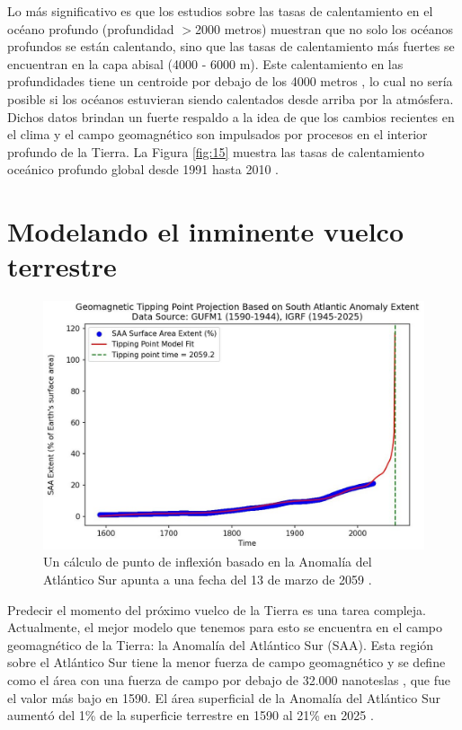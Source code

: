 \documentclass[10pt,twocolumn,letterpaper]{article}
\begin{document}
Lo más significativo es que los estudios sobre las tasas de calentamiento en el océano profundo (profundidad $>$2000 metros) muestran que no solo los océanos profundos se están calentando, sino que las tasas de calentamiento más fuertes se encuentran en la capa abisal (4000 - 6000 m). Este calentamiento en las profundidades tiene un centroide por debajo de los 4000 metros \cite{132,129}, lo cual no sería posible si los océanos estuvieran siendo calentados desde arriba por la atmósfera. Dichos datos brindan un fuerte respaldo a la idea de que los cambios recientes en el clima y el campo geomagnético son impulsados por procesos en el interior profundo de la Tierra. La Figura \ref{fig:15} muestra las tasas de calentamiento oceánico profundo global desde 1991 hasta 2010 \cite{132}.

\section{Modelando el inminente vuelco terrestre}

\begin{figure}[t]
\begin{center}
   \includegraphics[width=1\linewidth]{saa-crop.jpeg}
\end{center}
   \caption{Un cálculo de punto de inflexión basado en la Anomalía del Atlántico Sur apunta a una fecha del 13 de marzo de 2059 \cite{125,126}.}
\label{fig:16}
\label{fig:onecol}
\end{figure}

Predecir el momento del próximo vuelco de la Tierra es una tarea compleja. Actualmente, el mejor modelo que tenemos para esto se encuentra en el campo geomagnético de la Tierra: la Anomalía del Atlántico Sur (SAA). Esta región sobre el Atlántico Sur tiene la menor fuerza de campo geomagnético y se define como el área con una fuerza de campo por debajo de 32.000 nanoteslas \cite{135}, que fue el valor más bajo en 1590. El área superficial de la Anomalía del Atlántico Sur aumentó del 1\% de la superficie terrestre en 1590 al 21\% en 2025 \cite{136}.
\end{document}
